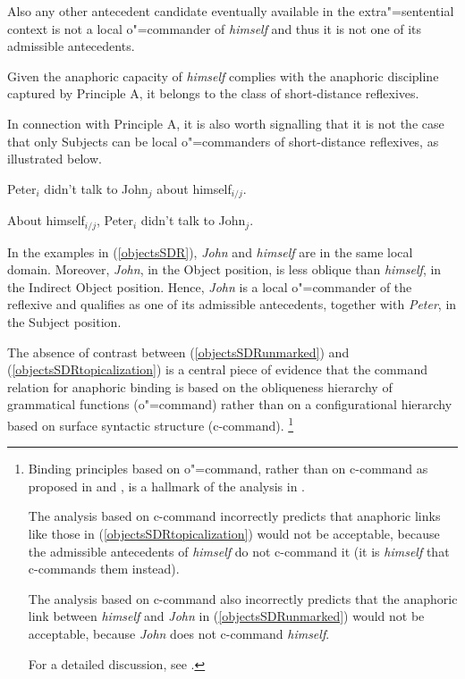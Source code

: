 \documentclass[output=paper
	        ,collection
	        ,collectionchapter
 	        ,biblatex
                ,babelshorthands
                ,newtxmath
                ,draftmode
                ,colorlinks, citecolor=brown
]{langscibook}
\begin{document}
Also any other antecedent candidate eventually available in the extra"=sentential context is not
a local o"=commander of {\em himself} and thus it is not one of its admissible antecedents.

Given the anaphoric capacity of {\em himself} complies with  the anaphoric discipline captured 
by Principle A, it belongs to the class of short-distance reflexives.

In connection with Principle A, it is also worth signalling that it is not the case that only Subjects
can be local o"=commanders of short-distance reflexives, as illustrated below.

\begin{exe}
\ex
\label{objectsSDR}
\begin{xlist}

\ex Peter$_{i}$ didn't talk to John$_{j}$ about himself$_{i/j}$.
\label{objectsSDRunmarked}
 
\ex About himself$_{i/j}$, Peter$_{i}$ didn't talk to John$_{j}$.
\label{objectsSDRtopicalization}
\end{xlist}

\end{exe}

In the examples in (\ref{objectsSDR}), {\em John} and {\em himself} are in the same local domain.
Moreover, {\em John}, in the Object position, is less oblique than {\em himself}, in the Indirect Object position. Hence, {\em John}
is a local o"=commander of the reflexive and qualifies as one of its admissible
antecedents, together with {\em Peter}, in the Subject position.

The absence of contrast between 
(\ref{objectsSDRunmarked}) and (\ref{objectsSDRtopicalization}) is a central piece of evidence that 
the command relation for anaphoric binding is based on the obliqueness hierarchy of grammatical functions (o"=command) 
rather than on a configurational hierarchy based on surface syntactic structure (c-command).%
\footnote{Binding principles based on o"=command, rather than on c-command as proposed in \citep{chom:bind80} and \citep{chom:knowledge86}, 
is a hallmark of the analysis in \citep{polsag:binding92}.

The analysis based on c-command incorrectly predicts
that anaphoric links like those in (\ref{objectsSDRtopicalization}) would not be acceptable, because the
admissible antecedents of {\em himself} do not c-command it (it is {\em himself} that c-commands them instead).

The analysis based on c-command also incorrectly predicts
that the anaphoric link between {\em himself} and {\em John} in (\ref{objectsSDRunmarked}) would not be acceptable, because
{\em John} does not c-command {\em himself}.

For a detailed discussion, see \citep[Chap.6]{polsag:hpsg94}.
}
\end{document}
